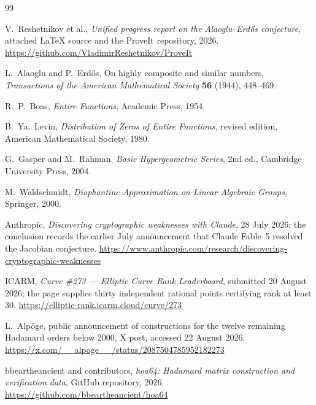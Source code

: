 \documentclass[11pt]{article}
\theoremstyle{definition}
\begin{document}
\begin{thebibliography}{99}

V.~Reshetnikov et al.,
\emph{Unified progress report on the Alaoglu--Erd\H{o}s conjecture},
attached \LaTeX{} source and the ProveIt repository, 2026.
\url{https://github.com/VladimirReshetnikov/ProveIt}

L.~Alaoglu and P.~Erd\H{o}s,
On highly composite and similar numbers,
\emph{Transactions of the American Mathematical Society} \textbf{56} (1944), 448--469.

R.~P.~Boas,
\emph{Entire Functions},
Academic Press, 1954.

B.~Ya.~Levin,
\emph{Distribution of Zeros of Entire Functions},
revised edition, American Mathematical Society, 1980.

G.~Gasper and M.~Rahman,
\emph{Basic Hypergeometric Series}, 2nd ed.,
Cambridge University Press, 2004.

M.~Waldschmidt,
\emph{Diophantine Approximation on Linear Algebraic Groups},
Springer, 2000.

Anthropic,
\emph{Discovering cryptographic weaknesses with Claude}, 28 July 2026; the conclusion records the earlier July announcement that Claude Fable~5 resolved the Jacobian conjecture.
\url{https://www.anthropic.com/research/discovering-cryptographic-weaknesses}

ICARM,
\emph{Curve \#273 --- Elliptic Curve Rank Leaderboard},
submitted 20 August 2026; the page supplies thirty independent rational points certifying rank at least $30$.
\url{https://elliptic-rank.icarm.cloud/curve/273}

L.~Alp\"oge,
public announcement of constructions for the twelve remaining Hadamard orders below 2000,
X post, accessed 22 August 2026.
\url{https://x.com/__alpoge__/status/2087504785952182273}

bbeartheancient and contributors,
\emph{hoa64: Hadamard matrix construction and verification data},
GitHub repository, 2026.
\url{https://github.com/bbeartheancient/hoa64}

\end{thebibliography}
\end{document}
